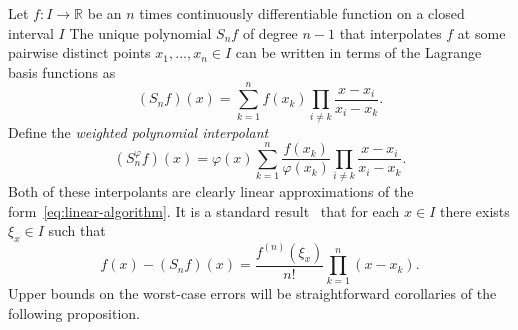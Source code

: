 \documentclass{mcom-l}
\numberwithin{equation}{section}
\numberwithin{theorem}{section} %
\newcommand{\R}{\mathbb{R}} %
\begin{document}
Let $f \colon I \to \R$ be an $n$ times continuously differentiable function on a closed interval $I$
The unique polynomial $S_n f$ of degree $n-1$ that interpolates $f$ at some pairwise distinct points $x_1, \ldots, x_n \in I$ can be written in terms of the Lagrange basis functions as
\begin{equation} \label{eq:polynomial-interpolant}
  (S_{n} f)(x) = \sum_{k=1}^n f(x_k) \prod_{i \neq k} \frac{x - x_i}{x_i - x_k}.
\end{equation}
Define the \emph{weighted polynomial interpolant}
\begin{equation} \label{eq:polynomial-interpolant-weighted}
  (S_{n}^\varphi f)(x) = \varphi(x) \sum_{k=1}^n \frac{f(x_k)}{\varphi(x_k)} \prod_{i \neq k} \frac{x - x_i}{x_i - x_k}.
\end{equation}
Both of these interpolants are clearly linear approximations of the form~\eqref{eq:linear-algorithm}.
It is a standard result~\cite[Sec.\@~2.6]{Hildebrand1987} that for each $x \in I$ there exists $\xi_x \in I$ such that
\begin{equation} \label{eq:polynomial-interpolation-error}
  f(x) - (S_{n} f)(x) = \frac{f^{(n)}(\xi_x)}{n!} \prod_{k=1}^n (x - x_k).
\end{equation}
Upper bounds on the worst-case errors will be straightforward corollaries of the following proposition.
\end{document}
